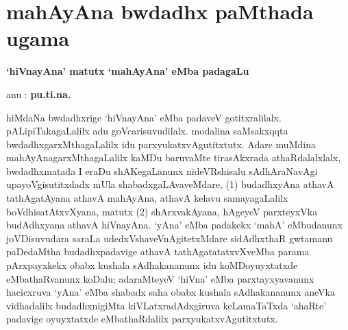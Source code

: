 \makeatletter
\def\@makechapterhead#1{%
  \vspace*{10\p@}%
\vspace*{25\p@}%
  {\parindent \z@ \centering \normalfont
    \ifnum \c@secnumdepth >\m@ne
      \if@mainmatter
        {\LARGE\bfseries  #1}\par\nobreak
	\vskip 4pt
      \fi
    \fi
\smallskip 

  }
\vskip 10\p@}
\makeatother

\chapter{mahAyAna bwdadhx paMthada ugama}

\setcounter{endnote}{0}

\begin{center}
{\textbf{\Large `hiVnayAna' matutx `mahAyAna' eMba padagaLu}}
\end{center}

\hfill {anu : {\bf pu.ti.na.}}

\bigskip
\bigskip

\noindent
hiMdaNa bwdadhxrige `hiVnayAna' eMba padaveV gotitxralilalx. pALipiTakagaLalilx adu goVcarisuvudilalx. modalina saMsakxqqta bwdadhxgarxMthagaLalilx idu parxyukatxvAgutitxtutx. Adare muMdina mahAyAnagarxMthagaLalilx kaMDu baruvaMte tirasAkxrada athaRdalalxlalx, bwdadhxmatada I eraDu shAKegaLanunx nideVRshisalu sAdhAraNavAgi upayoVgisutitxdadx mUla shabadxgaLAvaveMdare,
(1) budadhxyAna athavA tathAgatAyana athavA mahAyAna, athavA kelavu samayagaLalilx boVdhisatAtxvXyana, matutx
(2) shArxvakAyana, hAgeyeV parxteyxVka budAdhxyana athavA hiVnayAna.
`yAna' eMba padakekx `mahA' eMbudanunx joVDisuvudara saraLa udedxVsha\-veVnAgitetxMdare sidAdhxthaR gwtamanu paDedaMtha budadhxpadavige athavA tathAgatatatxvXveMba parama pArxpayxkekx obabx kushala sAdhakananunx idu koMDoyuyxtatxde eMbathaRvanunx koDalu; adaraMteyeV `hiVna' eMba parxtayxyavanunx hacicxruva `yAna' eMba shabadx saha obabx kushala sAdhakananunx aneVka vidhadalilx budadhxnigiMta  kiVLatxradAdxgiruva keLamaTaTxda `ahaRte' padavige oyuyxtatxde eMbathaRdalilx parxyukatxvAgutitxtutx.

